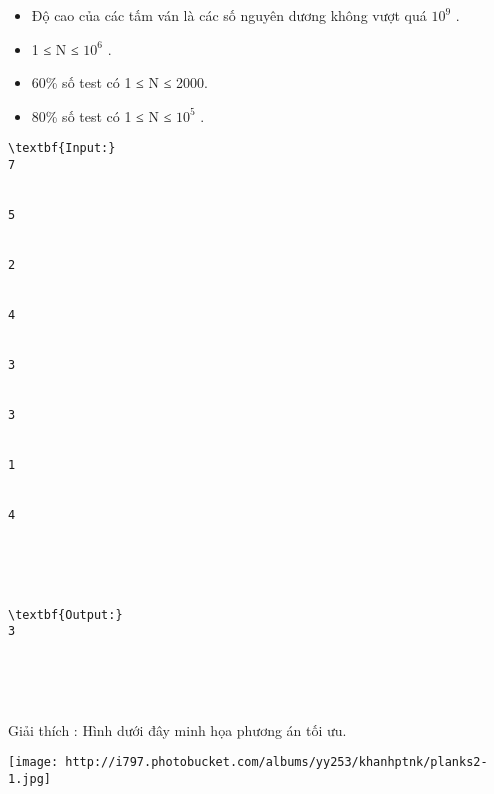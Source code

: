 \begin{itemize}
	\item     Độ cao của các tấm ván là các số nguyên dương không vượt quá $10^{9}$    .   
	\item     1 ≤ N ≤ $10^{6}$    .   
	\item     60\% số test có 1 ≤ N ≤ 2000.   
	\item     80\% số test có 1 ≤ N ≤ $10^{5}$    .   
\end{itemize}
\begin{verbatim}
\textbf{Input:}
7


5


2


4


3


3


1


4





\textbf{Output:}
3





\end{verbatim}

Giải thích        : Hình dưới đây minh họa phương án tối ưu.


\texttt{[image: http://i797.photobucket.com/albums/yy253/khanhptnk/planks2-1.jpg]}